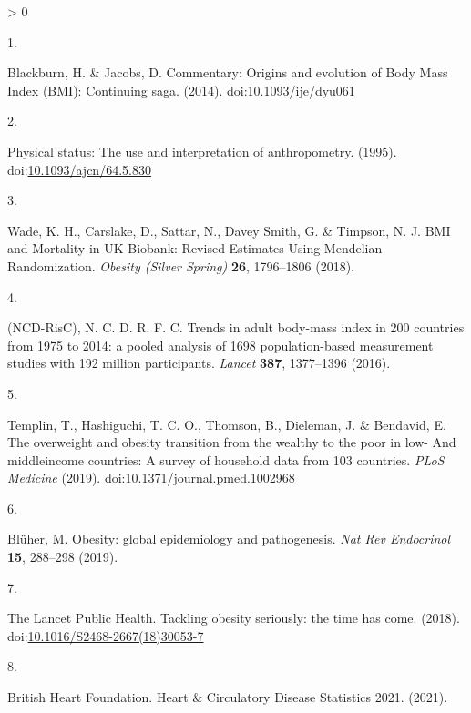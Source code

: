 \documentclass[11pt,twoside]{bristolthesis}
\newlength{\cslhangindent}
\newlength{\csllabelwidth}
\newenvironment{CSLReferences}[2] %
 {%
  \setlength{\parindent}{0pt}
  \ifodd #1 \everypar{\setlength{\hangindent}{\cslhangindent}}\ignorespaces\fi
  \ifnum #2 > 0
  \setlength{\parskip}{#2\baselineskip}
  \fi
 }%
 {}
\newcommand{\CSLLeftMargin}[1]{\parbox[t]{\csllabelwidth}{#1}}
\newcommand{\CSLRightInline}[1]{\parbox[t]{\linewidth - \csllabelwidth}{#1}\break}
\begin{document}
\noindent

\setlength{\parindent}{-0.20in}
\setlength{\leftskip}{0.20in}
\setlength{\parskip}{8pt}

\hypertarget{refs}{}
\begin{CSLReferences}{0}{0}
\leavevmode\hypertarget{ref-Blackburn2014}{}%
\CSLLeftMargin{1. }
\CSLRightInline{Blackburn, H. \& Jacobs, D. {Commentary: Origins and evolution of Body Mass Index (BMI): Continuing saga}. (2014). doi:\href{https://doi.org/10.1093/ije/dyu061}{10.1093/ije/dyu061}}

\leavevmode\hypertarget{ref-WHO1995}{}%
\CSLLeftMargin{2. }
\CSLRightInline{{Physical status: The use and interpretation of anthropometry}. (1995). doi:\href{https://doi.org/10.1093/ajcn/64.5.830}{10.1093/ajcn/64.5.830}}

\leavevmode\hypertarget{ref-Wade2018}{}%
\CSLLeftMargin{3. }
\CSLRightInline{Wade, K. H., Carslake, D., Sattar, N., Davey Smith, G. \& Timpson, N. J. {BMI and Mortality in UK Biobank: Revised Estimates Using Mendelian Randomization}. \emph{Obesity (Silver Spring)} \textbf{26}, 1796--1806 (2018).}

\leavevmode\hypertarget{ref-NCD-RisC2016}{}%
\CSLLeftMargin{4. }
\CSLRightInline{(NCD-RisC), N. C. D. R. F. C. {Trends in adult body-mass index in 200 countries from 1975 to 2014: a pooled analysis of 1698 population-based measurement studies with 19{{}}2 million participants}. \emph{Lancet} \textbf{387}, 1377--1396 (2016).}

\leavevmode\hypertarget{ref-Templin2019}{}%
\CSLLeftMargin{5. }
\CSLRightInline{Templin, T., Hashiguchi, T. C. O., Thomson, B., Dieleman, J. \& Bendavid, E. {The overweight and obesity transition from the wealthy to the poor in low- And middleincome countries: A survey of household data from 103 countries}. \emph{PLoS Medicine} (2019). doi:\href{https://doi.org/10.1371/journal.pmed.1002968}{10.1371/journal.pmed.1002968}}

\leavevmode\hypertarget{ref-Bluher2019}{}%
\CSLLeftMargin{6. }
\CSLRightInline{Blüher, M. {Obesity: global epidemiology and pathogenesis}. \emph{Nat Rev Endocrinol} \textbf{15}, 288--298 (2019).}

\leavevmode\hypertarget{ref-TheLancetPublicHealth2018}{}%
\CSLLeftMargin{7. }
\CSLRightInline{The Lancet Public Health. {Tackling obesity seriously: the time has come}. (2018). doi:\href{https://doi.org/10.1016/S2468-2667(18)30053-7}{10.1016/S2468-2667(18)30053-7}}

\leavevmode\hypertarget{ref-BritishHeartFoundation2021}{}%
\CSLLeftMargin{8. }
\CSLRightInline{British Heart Foundation. {Heart {\&} Circulatory Disease Statistics 2021}. (2021).}


\end{CSLReferences}
\end{document}
